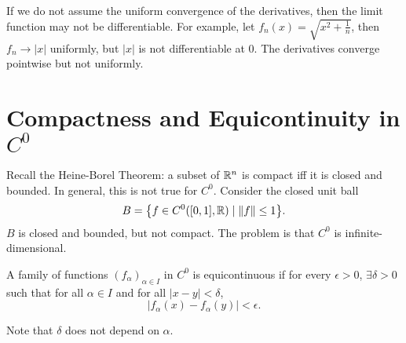 \begin{rmk}
    If we do not assume the uniform convergence of the derivatives, then the limit function may not be differentiable. For example, let $f_n(x) = \sqrt{x^2 + \frac1n}$, then $f_n \to |x|$ uniformly, but $|x|$ is not differentiable at $0$. The derivatives converge pointwise but not uniformly.
\end{rmk}

\section{Compactness and Equicontinuity in $C^0$}

Recall the Heine-Borel Theorem: a subset of ${\mathbb R}^n$ is compact iff it is closed and bounded. In general, this is not true for $C^0$. Consider the closed unit ball
\[
B = {\left\{{f \in C^0([0, 1], {\mathbb R}) \mid \|f\| \leq 1}\right\}}.
\]
$B$ is closed and bounded, but not compact. The problem is that $C^0$ is infinite-dimensional. 

\begin{df}
    A family of functions $(f_\alpha)_{\alpha \in I}$ in $C^0$ is equicontinuous if for every $\epsilon > 0$, $\exists \delta > 0$ such that for all $\alpha \in I$ and for all $|x - y| < \delta$,
    \[
    |f_\alpha(x) - f_\alpha(y)| < \epsilon.
    \]
\end{df}

Note that $\delta$ does not depend on $\alpha$.

